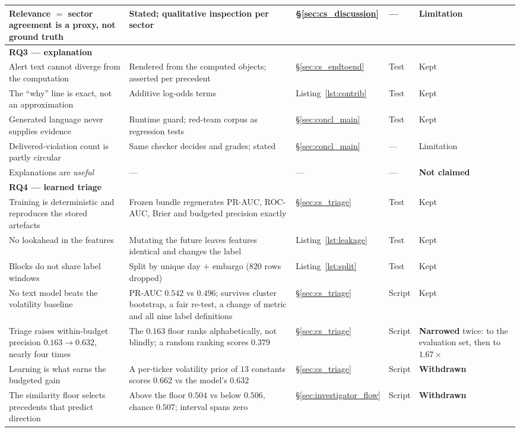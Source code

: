 \begin{table}[ht]
\begin{tabular}{p{4.6cm} p{3.5cm} p{1.6cm} p{1.2cm} p{1.7cm}}
Relevance $=$ sector agreement is a proxy, not ground truth & Stated; qualitative inspection per sector & §\ref{sec:cs_discussion} & --- & Limitation \\
\midrule
\multicolumn{5}{l}{\textbf{RQ3 — explanation}} \\
Alert text cannot diverge from the computation & Rendered from the computed objects; asserted per precedent & §\ref{sec:cs_endtoend} & Test & Kept \\
The ``why'' line is exact, not an approximation & Additive log-odds terms & Listing~\ref{lst:contrib} & Test & Kept \\
Generated language never supplies evidence & Runtime guard; red-team corpus as regression tests & §\ref{sec:concl_main} & Test & Kept \\
Delivered-violation count is partly circular & Same checker decides and grades; stated & §\ref{sec:concl_main} & --- & Limitation \\
Explanations are \emph{useful} & --- & --- & --- & \textbf{Not claimed} \\
\midrule
\multicolumn{5}{l}{\textbf{RQ4 — learned triage}} \\
Training is deterministic and reproduces the stored artefacts & Frozen bundle regenerates PR-AUC, ROC-AUC, Brier and budgeted precision exactly & §\ref{sec:cs_triage} & Test & Kept \\
No lookahead in the features & Mutating the future leaves features identical and changes the label & Listing~\ref{lst:leakage} & Test & Kept \\
Blocks do not share label windows & Split by unique day $+$ embargo ($820$ rows dropped) & Listing~\ref{lst:split} & Test & Kept \\
No text model beats the volatility baseline & PR-AUC $0.542$ vs $0.496$; survives cluster bootstrap, a fair re-test, a change of metric and all nine label definitions & §\ref{sec:cs_triage} & Script & Kept \\
Triage raises within-budget precision $0.163 \to 0.632$, nearly four times & The $0.163$ floor ranks alphabetically, not blindly; a random ranking scores $0.379$ & §\ref{sec:cs_triage} & Script & \textbf{Narrowed} twice: to the evaluation set, then to $1.67\times$ \\
Learning is what earns the budgeted gain & A per-ticker volatility prior of $13$ constants scores $0.662$ vs the model's $0.632$ & §\ref{sec:cs_triage} & Script & \textbf{Withdrawn} \\
The similarity floor selects precedents that predict direction & Above the floor $0.504$ vs below $0.506$, chance $0.507$; interval spans zero & §\ref{sec:investigator_flow} & Script & \textbf{Withdrawn} \\

\end{tabular}
\end{table}
